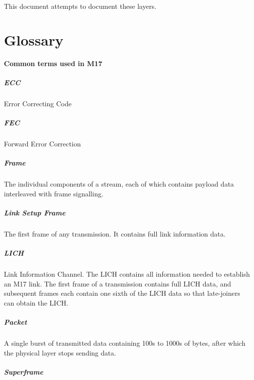 \documentclass[a4paper,11pt]{book}
\begin{document}
This document attempts to document these layers.

\chapter{Glossary}

\textbf{Common terms used in M17}

\paragraph{ECC}

Error Correcting Code

\paragraph{FEC}

Forward Error Correction

\paragraph{Frame}

The individual components of a stream, each of which contains payload data interleaved with frame signalling.

\paragraph{Link Setup Frame}

The first frame of any transmission. It contains full link information
data.

\paragraph{LICH}

Link Information Channel. The LICH contains all information needed to establish an M17 link. The first frame of a transmission contains full LICH data, and subsequent frames each contain one sixth of the LICH data so that late-joiners can obtain the LICH\@.

\paragraph{Packet}

A single burst of transmitted data containing 100s to 1000s of bytes, after which the physical layer stops sending data.

\paragraph{Superframe}
\end{document}
